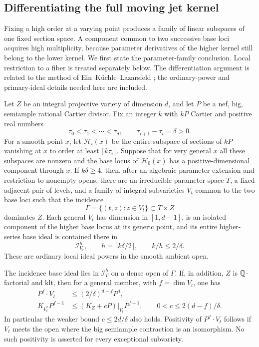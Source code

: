 \subsection{Differentiating the full moving jet kernel}

Fixing a high order at a varying point produces a family of
linear subspaces of one fixed section space. A component common
to two successive base loci acquires high multiplicity, because
parameter derivatives of the higher kernel still belong to the
lower kernel. We first state the parameter-family conclusion. Local restriction
to a fiber is treated separately below. The differentiation argument
is related to the method of Ein--K\"uchle--Lazarsfeld
\cite[Proposition~2.3]{EinKuchleLazarsfeld1995}; the ordinary-power
and primary-ideal details needed here are included.

\begin{lemma}
\label{common:moving-kernel}
Let $Z$ be an integral projective variety of dimension $d$, and
let $P$ be a nef, big, semiample rational Cartier divisor. Fix an integer $k$
with $kP$ Cartier and positive real numbers
\[
 \tau_0<\tau_1<\cdots<\tau_d,
 \qquad\tau_{i+1}-\tau_i=\delta>0.
\]
For a smooth point $x$, let $\mathcal H_i(x)$ be the entire
subspace of sections of $kP$ vanishing at $x$ to order at least
$\lceil k\tau_i\rceil$. Suppose that for very general $x$ all these
subspaces are nonzero and the base locus of $\mathcal H_0(x)$
has a positive-dimensional component through $x$.
If $k\delta\geq4$, then, after an algebraic parameter extension
and restriction to nonempty opens, there are an irreducible
parameter space $T$, a fixed adjacent pair of levels, and a
family of integral subvarieties $V_t$ common to the two base
loci such that the incidence
\[
 \Gamma=\{(t,z):z\in V_t\}\subset T\times Z
\]
dominates $Z$. Each general $V_t$ has dimension in $[1,d-1]$,
is an isolated component of the higher base locus at its generic
point, and its entire higher-series base ideal is contained
there in
\begin{equation}
\label{common:moving-multiplicity-order}
 \mathcal I_{V_t}^{h},\qquad h=\lceil k\delta/2\rceil,
 \qquad k/h\leq2/\delta.
\end{equation}
These are ordinary local ideal powers in the smooth ambient open.

The incidence base ideal lies in $\mathcal I_\Gamma^h$ on a dense
open of $\Gamma$. If, in addition, $Z$ is $\mathbb{Q}$-factorial and klt,
then for a general member, with $f=\dim V_t$, one has
\begin{equation}\label{common:tracking-bounds}
 \begin{split}
 P^f\cdot V_t&\le(2/\delta)^{d-f}P^d,\\
 K_{V_t^*}P^{f-1}&\le(K_Z+cP)|_{V_t}P^{f-1},
 \qquad 0<c\le2(d-f)/\delta .
 \end{split}
\end{equation}
In particular the weaker bound $c\le2d/\delta$ also holds.
Positivity of $P^f\cdot V_t$ follows if $V_t$ meets the open
where the big semiample contraction is an isomorphism. No such
positivity is asserted for every exceptional subvariety.
\end{lemma}

